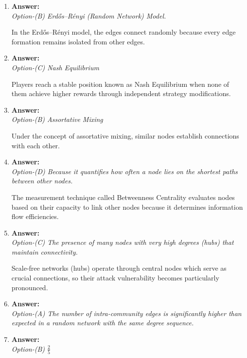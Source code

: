 \documentclass[a4paper,12pt]{article}
\begin{document}
\begin{enumerate}[label=\textbf{Q\arabic*.}]
\begin{enumerate}[label=(\alph*)]
        \item \textbf{Answer:} \\
        \textit{Option-(B) Erdős–Rényi (Random Network) Model.}

        In the Erdős–Rényi model, the edges connect randomly because every edge formation remains isolated from other edges.
        
        \item \textbf{Answer:} \\
        \textit{Option-(C) Nash Equilibrium}

        Players reach a stable position known as Nash Equilibrium when none of them achieve higher rewards through independent strategy modifications.
        
        \item \textbf{Answer:} \\
        \textit{Option-(B) Assortative Mixing}

        Under the concept of assortative mixing, similar nodes establish connections with each other.
        
        \item \textbf{Answer:} \\
        \textit{Option-(D) Because it quantifies how often a node lies on the shortest paths between other nodes.}

        The measurement technique called Betweenness Centrality evaluates nodes based on their capacity to link other nodes because it determines information flow efficiencies.
        
        \item \textbf{Answer:} \\
        \textit{Option-(C) The presence of many nodes with very high degrees (hubs) that maintain connectivity.}

        Scale-free networks (hubs) operate through central nodes which serve as crucial connections, so their attack vulnerability becomes particularly pronounced.
        
        \item \textbf{Answer:} \\
        \textit{Option-(A) The number of intra-community edges is significantly higher than expected in a random network with the same degree sequence.}
        
        \item \textbf{Answer:} \\
        \textit{Option-(B) \(\frac{2}{5}\)}


\end{enumerate}
\end{enumerate}
\end{document}

